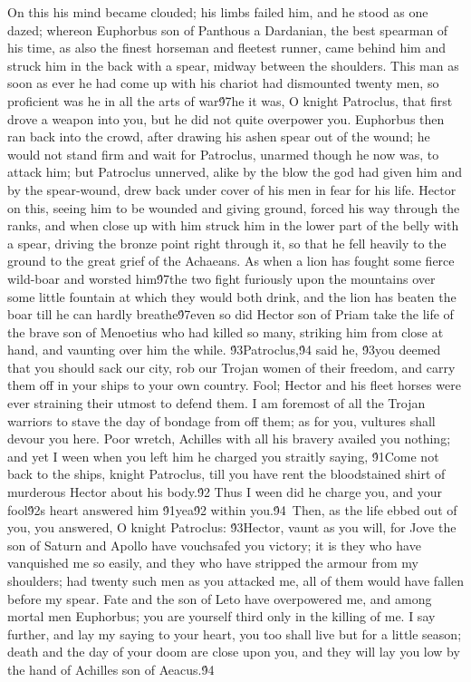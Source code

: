 {On this his mind became clouded; his limbs failed him, and he stood as one dazed; whereon Euphorbus son of Panthous a Dardanian, the best spearman of his time, as also the finest horseman and fleetest runner, came behind him and struck him in the back with a spear, midway between the shoulders. This man as soon as ever he had come up with his chariot had dismounted twenty men, so proficient was he in all the arts of war\'97he it was, O knight Patroclus, that first drove a weapon into you, but he did not quite overpower you. Euphorbus then ran back into the crowd, after drawing his ashen spear out of the wound; he would not stand firm and wait for Patroclus, unarmed though he now was, to attack him; but Patroclus unnerved, alike by the blow the god had given him and by the spear-wound, drew back under cover of his men in fear for his life. Hector on this, seeing him to be wounded and giving ground, forced his way through the ranks, and when close up with him struck him in the lower part of the belly with a spear, driving the bronze point right through it, so that he fell heavily to the ground to the great grief of the Achaeans. As when a lion has fought some fierce wild-boar and worsted him\'97the two fight furiously upon the mountains over some little fountain at which they would both drink, and the lion has beaten the boar till he can hardly breathe\'97even so did Hector son of Priam take the life of the brave son of Menoetius who had killed so many, striking him from close at hand, and vaunting over him the while. \'93Patroclus,\'94 said he, \'93you deemed that you should sack our city, rob our Trojan women of their freedom, and carry them off in your ships to your own country. Fool; Hector and his fleet horses were ever straining their utmost to defend them. I am foremost of all the Trojan warriors to stave the day of bondage from off them; as for you, vultures shall devour you here. Poor wretch, Achilles with all his bravery availed you nothing; and yet I ween when you left him he charged you straitly saying, \'91Come not back to the ships, knight Patroclus, till you have rent the bloodstained shirt of murderous Hector about his body.\'92 Thus I ween did he charge you, and your fool\'92s heart answered him \'91yea\'92 within you.\'94\
Then, as the life ebbed out of you, you answered, O knight Patroclus: \'93Hector, vaunt as you will, for Jove the son of Saturn and Apollo have vouchsafed you victory; it is they who have vanquished me so easily, and they who have stripped the armour from my shoulders; had twenty such men as you attacked me, all of them would have fallen before my spear. Fate and the son of Leto have overpowered me, and among mortal men Euphorbus; you are yourself third only in the killing of me. I say further, and lay my saying to your heart, you too shall live but for a little season; death and the day of your doom are close upon you, and they will lay you low by the hand of Achilles son of Aeacus.\'94\
}

